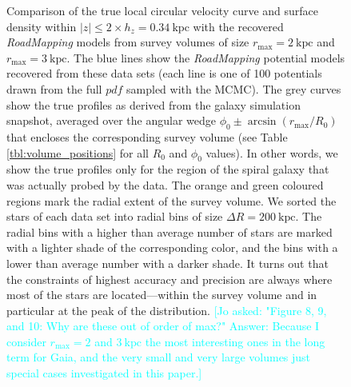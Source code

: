 \documentclass[iop,revtex4,numberedappendix,appendixfloats]{emulateapj}
\newcommand{\RM}{{\sl RoadMapping}}
\newcommand{\Jo}[1]{\textcolor{Cyan}{#1}}
\begin{document}
\begin{figure}[!htbp]
\centering
\caption{Comparison of the true local circular velocity curve and surface density within $|z| \leq 2 \times h_z = 0.34~\text{kpc}$ with the recovered \RM{} models from survey volumes of size $r_\text{max}=2~\text{kpc}$ and $r_\text{max}=3~\text{kpc}$. The blue lines show the \RM{} potential models recovered from these data sets (each line is one of 100 potentials drawn from the full $pdf$ sampled with the MCMC). The grey curves show the true profiles as derived from the galaxy simulation snapshot, averaged over the angular wedge $\phi_0\pm\arcsin(r_\text{max}/R_0)$ that encloses the corresponding survey volume (see Table \ref{tbl:volume_positions} for all $R_0$ and $\phi_0$ values). In other words, we show the true profiles only for the region of the spiral galaxy that was actually probed by the data. The orange and green coloured regions mark the radial extent of the survey volume. We sorted the stars of each data set into radial bins of size $\Delta R = 200~\text{kpc}$. The radial bins with a higher than average number of stars are marked with a lighter shade of the corresponding color, and the bins with a lower than average number with a darker shade. It turns out that the constraints of highest accuracy and precision are always where most of the stars are located---within the survey volume and in particular at the peak of the distribution. \Jo{[Jo asked: "Figure 8, 9, and 10: Why are these out of order of max?" Answer: Because I consider $r_\text{max}=2$ and $3~\text{kpc}$ the most interesting ones in the long term for Gaia, and the very small and very large volumes just special cases investigated in this paper.]}}
    \label{fig:vcirc_surfdens_suite_medium}
\end{figure}
\end{document}
